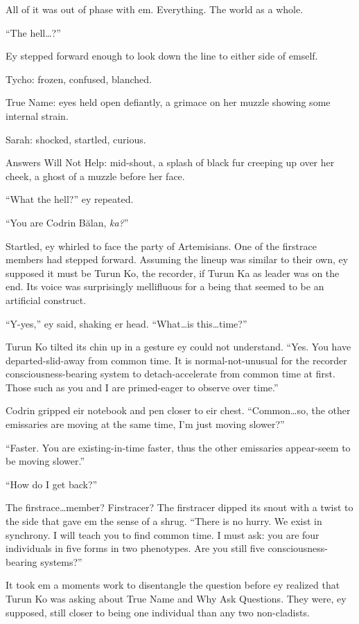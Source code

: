All of it was out of phase with em. Everything. The world as a whole.

``The hell\ldots?''

Ey stepped forward enough to look down the line to either side of emself.

Tycho: frozen, confused, blanched.

True Name: eyes held open defiantly, a grimace on her muzzle showing some internal strain.

Sarah: shocked, startled, curious.

Answers Will Not Help: mid-shout, a splash of black fur creeping up over her cheek, a ghost of a muzzle before her face.

``What the hell?'' ey repeated.

``You are Codrin Bălan, \emph{ka?}''

Startled, ey whirled to face the party of Artemisians. One of the firstrace members had stepped forward. Assuming the lineup was similar to their own, ey supposed it must be Turun Ko, the recorder, if Turun Ka as leader was on the end. Its voice was surprisingly mellifluous for a being that seemed to be an artificial construct.

``Y-yes,'' ey said, shaking er head. ``What\ldots is this\ldots time?''

Turun Ko tilted its chin up in a gesture ey could not understand. ``Yes. You have departed-slid-away from common time. It is normal-not-unusual for the recorder consciousness-bearing system to detach-accelerate from common time at first. Those such as you and I are primed-eager to observe over time.''

Codrin gripped eir notebook and pen closer to eir chest. ``Common\ldots so, the other emissaries are moving at the same time, I'm just moving slower?''

``Faster. You are existing-in-time faster, thus the other emissaries appear-seem to be moving slower.''

``How do I get back?''

The firstrace\ldots member? Firstracer? The firstracer dipped its snout with a twist to the side that gave em the sense of a shrug. ``There is no hurry. We exist in synchrony. I will teach you to find common time. I must ask: you are four individuals in five forms in two phenotypes. Are you still five consciousness-bearing systems?''

It took em a moments work to disentangle the question before ey realized that Turun Ko was asking about True Name and Why Ask Questions. They were, ey supposed, still closer to being one individual than any two non-cladists.

